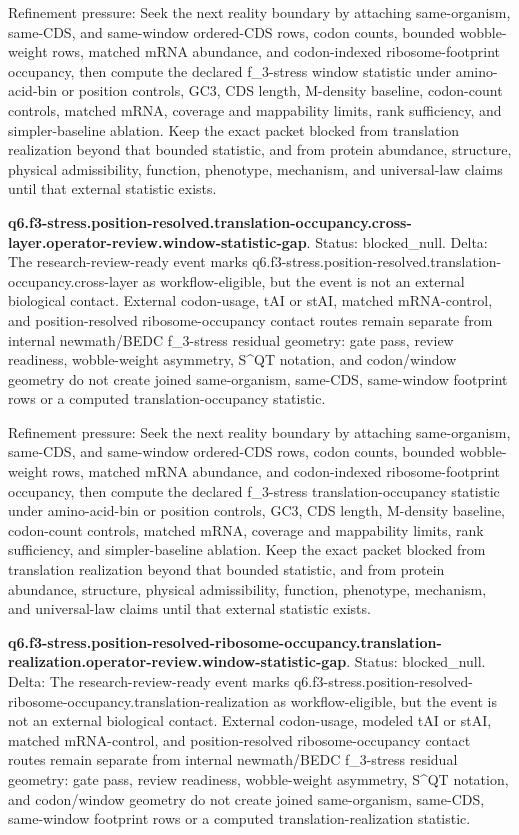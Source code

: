 Refinement pressure: Seek the next reality boundary by attaching same-organism, same-CDS, and same-window ordered-CDS rows, codon counts, bounded wobble-weight rows, matched mRNA abundance, and codon-indexed ribosome-footprint occupancy, then compute the declared f\_3-stress window statistic under amino-acid-bin or position controls, GC3, CDS length, M-density baseline, codon-count controls, matched mRNA, coverage and mappability limits, rank sufficiency, and simpler-baseline ablation. Keep the exact packet blocked from translation realization beyond that bounded statistic, and from protein abundance, structure, physical admissibility, function, phenotype, mechanism, and universal-law claims until that external statistic exists.

\textbf{q6.f3-stress.position-resolved.translation-occupancy.cross-layer.operator-review.window-statistic-gap}. Status: blocked\_null. Delta: The research-review-ready event marks q6.f3-stress.position-resolved.translation-occupancy.cross-layer as workflow-eligible, but the event is not an external biological contact. External codon-usage, tAI or stAI, matched mRNA-control, and position-resolved ribosome-occupancy contact routes remain separate from internal newmath/BEDC f\_3-stress residual geometry: gate pass, review readiness, wobble-weight asymmetry, S\textasciicircum{}QT notation, and codon/window geometry do not create joined same-organism, same-CDS, same-window footprint rows or a computed translation-occupancy statistic.

Refinement pressure: Seek the next reality boundary by attaching same-organism, same-CDS, and same-window ordered-CDS rows, codon counts, bounded wobble-weight rows, matched mRNA abundance, and codon-indexed ribosome-footprint occupancy, then compute the declared f\_3-stress translation-occupancy statistic under amino-acid-bin or position controls, GC3, CDS length, M-density baseline, codon-count controls, matched mRNA, coverage and mappability limits, rank sufficiency, and simpler-baseline ablation. Keep the exact packet blocked from translation realization beyond that bounded statistic, and from protein abundance, structure, physical admissibility, function, phenotype, mechanism, and universal-law claims until that external statistic exists.

\textbf{q6.f3-stress.position-resolved-ribosome-occupancy.translation-realization.operator-review.window-statistic-gap}. Status: blocked\_null. Delta: The research-review-ready event marks q6.f3-stress.position-resolved-ribosome-occupancy.translation-realization as workflow-eligible, but the event is not an external biological contact. External codon-usage, modeled tAI or stAI, matched mRNA-control, and position-resolved ribosome-occupancy contact routes remain separate from internal newmath/BEDC f\_3-stress residual geometry: gate pass, review readiness, wobble-weight asymmetry, S\textasciicircum{}QT notation, and codon/window geometry do not create joined same-organism, same-CDS, same-window footprint rows or a computed translation-realization statistic.

